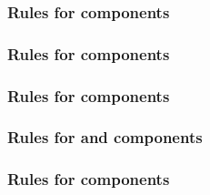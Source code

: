 \begin{sbmlenum}

\end{sbmlenum} \subsubsection*{Rules for  components} \begin{sbmlenum}


\end{sbmlenum} \subsubsection*{Rules for  components} \begin{sbmlenum}


\end{sbmlenum} \subsubsection*{Rules for  components} \begin{sbmlenum}


\end{sbmlenum} \subsubsection*{Rules for  and  components} \begin{sbmlenum}


\end{sbmlenum} \subsubsection*{Rules for  components} \begin{sbmlenum}


\end{sbmlenum}
